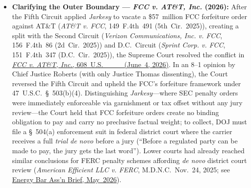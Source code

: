 \documentclass[12pt]{article}
\begin{document}
\begin{itemize}

\item \textbf{Clarifying the Outer Boundary --- \textit{FCC v. AT\&T, Inc.} (2026):} After the Fifth Circuit applied \textit{Jarkesy} to vacate a \$57~million FCC forfeiture order against AT\&T (\textit{AT\&T v. FCC}, 149~F.4th~491 (5th~Cir.~2025)), creating a split with the Second Circuit (\textit{Verizon Communications, Inc. v. FCC}, 156~F.4th~86 (2d~Cir.~2025)) and D.C.~Circuit (\textit{Sprint Corp. v. FCC}, 151~F.4th~347 (D.C.~Cir.~2025)), the Supreme Court resolved the conflict in \href{https://supreme.justia.com/cases/federal/us/608/25-406/}{\textit{FCC v. AT\&T, Inc.}, 608~U.S.~\_\_\_ (June~4, 2026)}. In an 8--1 opinion by Chief Justice Roberts (with only Justice Thomas dissenting), the Court reversed the Fifth Circuit and upheld the FCC's forfeiture framework under 47~U.S.C.~\S~503(b)(4). Distinguishing \textit{Jarkesy}---where SEC penalty orders were immediately enforceable via garnishment or tax offset without any jury review---the Court held that FCC forfeiture orders create no binding obligation to pay and carry no preclusive factual weight; to collect, DOJ must file a \S~504(a) enforcement suit in federal district court where the carrier receives a full \textit{trial de novo} before a jury (``Before a regulated party can be made to pay, the jury gets the last word''). Lower courts had already reached similar conclusions for FERC penalty schemes affording \textit{de novo} district court review (\textit{American Efficient LLC v. FERC}, M.D.N.C.~Nov.~24, 2025; see \href{https://www.eba-net.org/wp-content/uploads/2026/05/EBA-Brief-2026-Vol-7.1.pdf}{Energy Bar Ass'n Brief, May~2026}).

\end{itemize}
\end{document}
